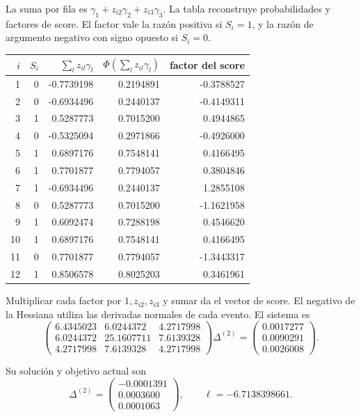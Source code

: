 \documentclass[11pt,a4paper]{article}
\begin{document}
La suma por fila es
\(\gamma_1+z_{i2}\gamma_2+z_{i3}\gamma_3\).
La tabla reconstruye probabilidades
y factores de score.
El factor vale la razón
positiva si \(S_i=1\),
y la razón de argumento
negativo con signo opuesto
si \(S_i=0\).
\begin{center}\small\begin{tabular}{rrrrr}\toprule
\(i\)&\(S_i\)&\(\sum_lz_{il}\gamma_l\)&\(\Phi(\sum_lz_{il}\gamma_l)\)&factor del score\\\midrule
1&0&-0.7739198&0.2194891&-0.3788527\\
2&0&-0.6934496&0.2440137&-0.4149311\\
3&1&0.5287773&0.7015200&0.4944865\\
4&0&-0.5325094&0.2971866&-0.4926000\\
5&1&0.6897176&0.7548141&0.4166495\\
6&1&0.7701877&0.7794057&0.3804846\\
7&1&-0.6934496&0.2440137&1.2855108\\
8&0&0.5287773&0.7015200&-1.1621958\\
9&1&0.6092474&0.7288198&0.4546620\\
10&1&0.6897176&0.7548141&0.4166495\\
11&0&0.7701877&0.7794057&-1.3443317\\
12&1&0.8506578&0.8025203&0.3461961\\\bottomrule\end{tabular}\end{center}
Multiplicar cada factor por
\(1,z_{i2},z_{i3}\)
y sumar da el vector
de score.
El negativo de la Hessiana
utiliza las derivadas
normales de cada evento.
El sistema es
\[
\begin{pmatrix}6.4345023&6.0244372&4.2717998\\6.0244372&25.1607711&7.6139328\\4.2717998&7.6139328&4.2717998\end{pmatrix}\Delta^{(2)}=\begin{pmatrix}0.0017277\\0.0090291\\0.0026008\end{pmatrix}.
\]

Su solución y objetivo actual son
\[
\Delta^{(2)}=\begin{pmatrix}-0.0001391\\0.0003600\\0.0001063\end{pmatrix},\qquad\ell=-6.7138398661.
\]
\end{document}
